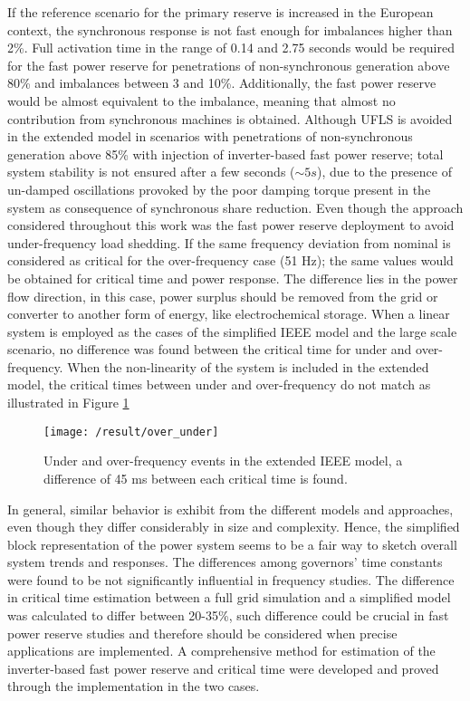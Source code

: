 If the reference scenario for the primary reserve is increased in the European context, the synchronous response is not fast enough for imbalances higher than 2\%. Full activation time in the range of 0.14 and 2.75 seconds would be required for the fast power reserve for penetrations of non-synchronous generation above 80\% and imbalances between 3 and 10\%. Additionally, the fast power reserve would be almost equivalent to the imbalance, meaning that almost no contribution from synchronous machines is obtained. Although UFLS is avoided in the extended model in scenarios with penetrations of non-synchronous generation above 85\% with injection of inverter-based fast power reserve; total system stability is not ensured after a few seconds ($ \sim5 s $), due to the presence of un-damped oscillations provoked by the poor damping torque present in the system as consequence of synchronous share reduction. Even though the approach considered throughout this work was the fast power reserve deployment to avoid under-frequency load shedding. If the same frequency deviation from nominal is considered as critical for the over-frequency case (51 Hz); the same values would be obtained for critical time and power response. The difference lies in the power flow direction, in this case, power surplus should be removed from the grid or converter to another form of energy, like electrochemical storage. When a linear system is employed as the cases of the simplified IEEE model and the large scale scenario, no difference was found between the critical time for under and over-frequency. When the non-linearity of the system is included in the extended model, the critical times between under and over-frequency do not match as illustrated in Figure \ref{fig:res_over_under}\\

\begin{figure}[h]
	\centering
	\texttt{[image: /result/over\_under]}
	\caption{Under and over-frequency events in the extended IEEE model, a difference of 45 ms between each critical time is found.}
	\label{fig:res_over_under}
\end{figure}

In general, similar behavior is exhibit from the different models and approaches, even though they differ considerably in size and complexity. Hence, the simplified block representation of the power system seems to be a fair way to sketch overall system trends and responses. The differences among governors' time constants were found to be not significantly influential in frequency studies. The difference in critical time estimation between a full grid simulation and a simplified model was calculated to differ between 20-35\%, such difference could be crucial in fast power reserve studies and therefore should be considered when precise applications are implemented. A comprehensive method for estimation of the inverter-based fast power reserve and critical time were developed and proved through the implementation in the two cases. 
